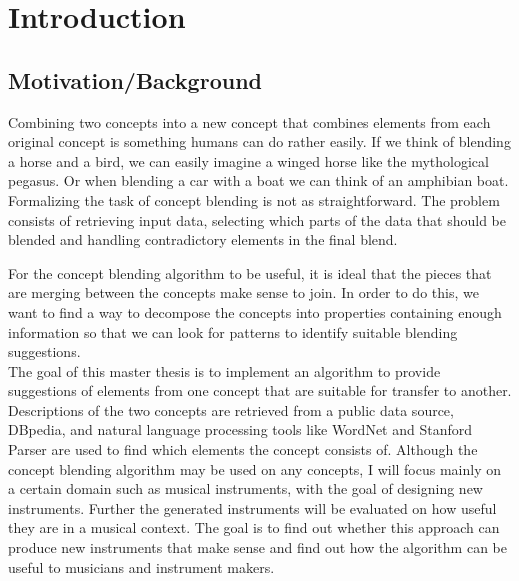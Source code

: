 
\chapter{Introduction} %

\label{Chapter1} %


\newcommand{\keyword}[1]{\textbf{#1}}
\newcommand{\tabhead}[1]{\textbf{#1}}
\newcommand{\code}[1]{\texttt{#1}}
\newcommand{\file}[1]{\texttt{\bfseries#1}}
\newcommand{\option}[1]{\texttt{\itshape#1}}


\section{Motivation/Background}
Combining two concepts into a new concept that combines elements from each original concept is something humans can do rather easily. If we think of blending a horse and a bird, we can easily imagine a winged horse like the mythological pegasus. Or when blending a car with a boat we can think of an amphibian boat. Formalizing the task of concept blending is not as straightforward. The problem consists of retrieving input data, selecting which parts of the data that should be blended and handling contradictory elements in the final blend.

For the concept blending algorithm to be useful, it is ideal that the pieces that are merging between the concepts make sense to join. In order to do this, we want to find a way to decompose the concepts into properties containing enough information so that we can look for patterns to identify suitable blending suggestions. %
\\The goal of this master thesis is to implement an algorithm to provide suggestions of elements from one concept that are suitable for transfer to another. Descriptions of the two concepts are retrieved from a public data source, DBpedia, and natural language processing tools like WordNet and Stanford Parser are used to find which elements the concept consists of. Although the concept blending algorithm may be used on any concepts, I will focus mainly on a certain domain such as musical instruments, with the goal of designing new instruments. Further the generated instruments will be evaluated on how useful they are in a musical context. The goal is to find out whether this approach can produce new instruments that make sense and find out how the algorithm can be useful to musicians and instrument makers.

